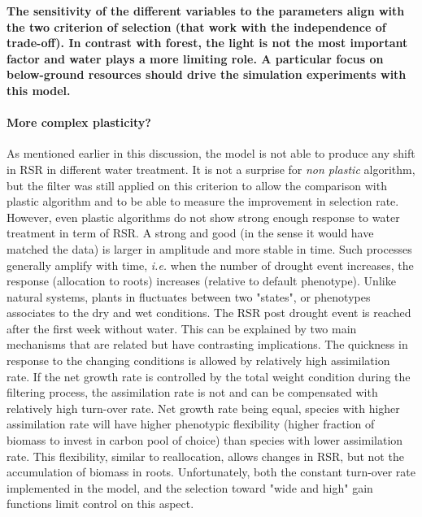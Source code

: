 
\textbf{The sensitivity of the different variables to the parameters align with the two criterion of selection (that work with the independence of trade-off). In contrast with forest, the light is not the most important factor and water plays a more limiting role. A particular focus on below-ground resources should drive the simulation experiments with this model.}

\paragraph{More complex plasticity?}

As mentioned earlier in this discussion, the model is not able to produce any shift in RSR in different water treatment. It is not a surprise for \textit{non plastic} algorithm, but the filter was still applied on this criterion to allow the comparison with plastic algorithm and to be able to measure the improvement in selection rate. However, even plastic algorithms do not show strong enough response to water treatment in term of RSR. A strong and good (in the sense it would have matched the data) is larger in amplitude and more stable in time. Such processes generally amplify with time, \textit{i.e.} when the number of drought event increases, the response (allocation to roots) increases (relative to default phenotype). Unlike natural systems, plants in \model fluctuates between two "states", or phenotypes associates to the dry and wet conditions. The RSR post drought event is reached after the first week without water. This can be explained by two main mechanisms that are related but have contrasting implications. The quickness in response to the changing conditions is allowed by relatively high assimilation rate. If the net growth rate is controlled by the total weight condition during the filtering process, the assimilation rate is not and can be compensated with relatively high turn-over rate. Net growth rate being equal, species with higher assimilation rate will have higher phenotypic flexibility (higher fraction of biomass to invest in carbon pool of choice) than species with lower assimilation rate. This flexibility, similar to reallocation, allows changes in RSR, but not the accumulation of biomass in roots. Unfortunately, both the constant turn-over rate implemented in the model, and the selection toward "wide and high" gain functions limit control on this aspect.

